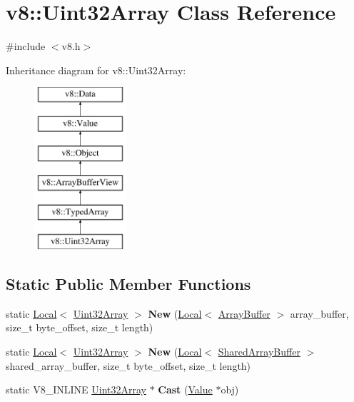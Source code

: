 \hypertarget{classv8_1_1Uint32Array}{}\section{v8\+:\+:Uint32\+Array Class Reference}
\label{classv8_1_1Uint32Array}


{\ttfamily \#include $<$v8.\+h$>$}

Inheritance diagram for v8\+:\+:Uint32\+Array\+:\begin{figure}[H]
\begin{center}
\leavevmode
\includegraphics[height=6.000000cm]{classv8_1_1Uint32Array}
\end{center}
\end{figure}
\subsection*{Static Public Member Functions}
\begin{DoxyCompactItemize}
\item 
\hypertarget{classv8_1_1Uint32Array_ab8dbef5ff846fc6cc9381bc29f744b5b}{}static \hyperlink{classv8_1_1Local}{Local}$<$ \hyperlink{classv8_1_1Uint32Array}{Uint32\+Array} $>$ {\bfseries New} (\hyperlink{classv8_1_1Local}{Local}$<$ \hyperlink{classv8_1_1ArrayBuffer}{Array\+Buffer} $>$ array\+\_\+buffer, size\+\_\+t byte\+\_\+offset, size\+\_\+t length)\label{classv8_1_1Uint32Array_ab8dbef5ff846fc6cc9381bc29f744b5b}

\item 
\hypertarget{classv8_1_1Uint32Array_a03da1a9371316818a926d2b8231ac33a}{}static \hyperlink{classv8_1_1Local}{Local}$<$ \hyperlink{classv8_1_1Uint32Array}{Uint32\+Array} $>$ {\bfseries New} (\hyperlink{classv8_1_1Local}{Local}$<$ \hyperlink{classv8_1_1SharedArrayBuffer}{Shared\+Array\+Buffer} $>$ shared\+\_\+array\+\_\+buffer, size\+\_\+t byte\+\_\+offset, size\+\_\+t length)\label{classv8_1_1Uint32Array_a03da1a9371316818a926d2b8231ac33a}

\item 
\hypertarget{classv8_1_1Uint32Array_ad40e645ee0abac443dba759ee861de49}{}static V8\+\_\+\+I\+N\+L\+I\+N\+E \hyperlink{classv8_1_1Uint32Array}{Uint32\+Array} $\ast$ {\bfseries Cast} (\hyperlink{classv8_1_1Value}{Value} $\ast$obj)\label{classv8_1_1Uint32Array_ad40e645ee0abac443dba759ee861de49}

\end{DoxyCompactItemize}
